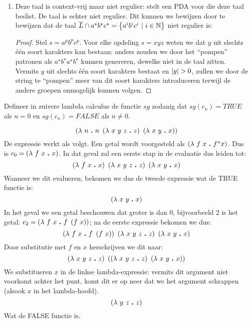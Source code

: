 \documentclass[a4paper]{article}
\begin{document}
\begin{question}
\begin{answer}
\begin{enumerate}
 \item Deze taal is context-vrij maar niet regulier:  stelt een PDA voor die deze taal beslist. De taal is echter niet regulier. Dit kunnen we bewijzen door te bewijzen dat de taal $\overline{L}\cap a^{\star}b^{\star}c^{\star}=\left\{ a^ib^ic^i\ |\ i\in\mathbb{N} \right\}$ niet regulier is:
 \begin{proof}
  Stel $s=a^pb^pc^p$. Voor elke opdeling $s=xyz$ weten we dat $y$ uit slechts \'e\'en soort karakters kan bestaan: anders zouden we door het ``pompen'' patronen als $a^{\star}b^{\star}a^{\star}b^{\star}$ kunnen genereren, dewelke niet in de taal zitten. Vermits $y$ uit slechts \'e\'en soort karakters bestaat en $\abs{y}>0$, zullen we door de string te ``pompen'' meer van dit soort karakters introduceren terwijl de andere groepen onmogelijk kunnen volgen.
 \end{proof}
\end{enumerate}
\end{answer}
\end{question}

\begin{question}
Defineer in zuivere lambda calculus de functie $sg$ zodanig dat $sg(c_n) = TRUE$ als $n = 0$ en $sg(c_n) = FALSE$ als $n \neq 0$.
\begin{answer}
\begin{equation}
\lambdacal{n}{n\ \lambdacal{x\ y\ z}{z}\ \lambdacal{x\ y}{x}}
\end{equation}
De expressie werkt als volgt. Een getal wordt voorgesteld als $\left( \lambda\ f\ x\ {\boldsymbol .}\ f^n x \right)$. Dus is $c_0=\lambdacal{f\ x}{x}$. In dat geval zal een eerste stap in de evaluatie dus leiden tot:
\begin{equation}
\lambdacal{f\ x}{x}\ \lambdacal{x\ y\ z}{z}\ \lambdacal{x\ y}{x}
\end{equation}
Wanneer we dit evalueren, bekomen we dus de tweede expressie wat de TRUE functie is:
\begin{equation}
\left( \lambda\ x\ y\ {\boldsymbol .}\ x \right)
\end{equation}
In het geval we een getal beschouwen dat groter is dan $0$, bijvoorbeeld $2$ is het getal: $c_2=\lambdacal{f\ x}{f\ \brak{f\ x}}$; na de eerste expressie bekomen we dus:
\begin{equation}
\lambdacal{f\ x}{f\ \brak{f\ x}}\ \lambdacal{x\ y\ z}{z}\ \lambdacal{x\ y}{x}
\end{equation}
Door substitutie met $f$ en $x$ herschrijven we dit naar:
\begin{equation}
\lambdacal{x\ y\ z}{z}\ \brak{\lambdacal{x\ y\ z}{z}\ \lambdacal{x\ y}{x}}
\end{equation}
We substitueren $x$ in de linkse lambda-expressie: vermits dit argument niet voorkomt achter het punt, komt dit er op neer dat we het argument schrappen (alsook $x$ in het lambda-hoofd).
\begin{equation}
\lambdacal{y\ z}{z}
\end{equation}
Wat de FALSE functie is.
\end{answer}
\end{question}
\end{document}
